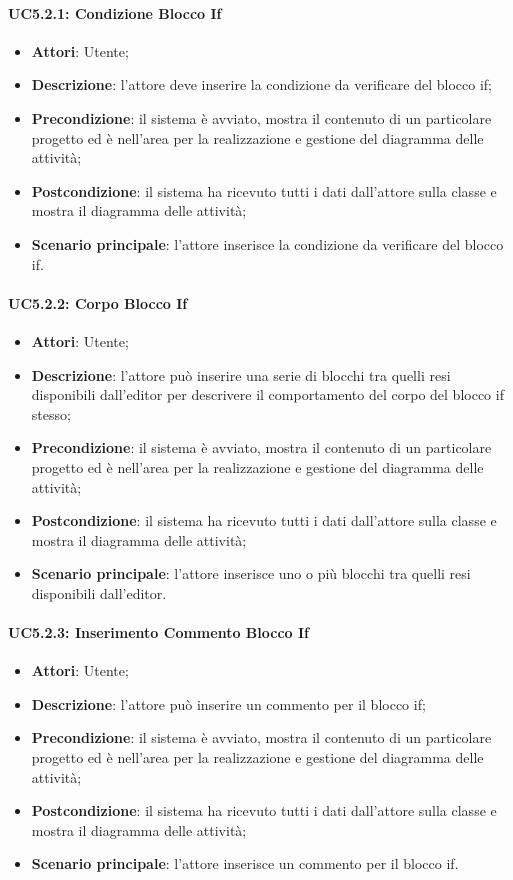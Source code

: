 \paragraph{UC5.2.1: Condizione Blocco If}
\label{UC5.2.1}
\begin{itemize}
	\item \textbf{Attori}: Utente;
	\item \textbf{Descrizione}: l'attore deve inserire la condizione da verificare del blocco if;
	\item \textbf{Precondizione}: il sistema è avviato, mostra il contenuto di un particolare progetto ed è nell'area per la realizzazione e gestione del diagramma delle attività;
	\item \textbf{Postcondizione}: il sistema ha ricevuto tutti i dati dall'attore sulla classe e mostra il diagramma delle attività;
	\item \textbf{Scenario principale}: l'attore inserisce la condizione da verificare del blocco if.
\end{itemize}

\paragraph{UC5.2.2: Corpo Blocco If}
\label{UC5.2.2}
\begin{itemize}
	\item \textbf{Attori}: Utente;
	\item \textbf{Descrizione}: l'attore può inserire una serie di blocchi tra quelli resi disponibili dall'editor per descrivere il comportamento del corpo del blocco if stesso;
	\item \textbf{Precondizione}: il sistema è avviato, mostra il contenuto di un particolare progetto ed è nell'area per la realizzazione e gestione del diagramma delle attività;
	\item \textbf{Postcondizione}: il sistema ha ricevuto tutti i dati dall'attore sulla classe e mostra il diagramma delle attività;
	\item \textbf{Scenario principale}: l'attore inserisce uno o più blocchi tra quelli resi disponibili dall'editor.
\end{itemize}

\paragraph{UC5.2.3: Inserimento Commento Blocco If}
\label{UC5.2.3}
\begin{itemize}
	\item \textbf{Attori}: Utente;
	\item \textbf{Descrizione}: l'attore può inserire un commento per il blocco if;
	\item \textbf{Precondizione}: il sistema è avviato, mostra il contenuto di un particolare progetto ed è nell'area per la realizzazione e gestione del diagramma delle attività;
	\item \textbf{Postcondizione}: il sistema ha ricevuto tutti i dati dall'attore sulla classe e mostra il diagramma delle attività;
	\item \textbf{Scenario principale}: l'attore inserisce un commento per il blocco if.
\end{itemize}

